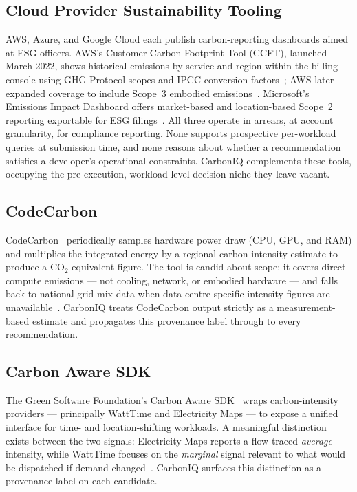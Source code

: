 ﻿\documentclass[conference]{IEEEtran}
\begin{document}
\subsection{Cloud Provider Sustainability Tooling}

AWS, Azure, and Google Cloud each publish carbon-reporting dashboards aimed at ESG
officers.
AWS's Customer Carbon Footprint Tool (CCFT), launched March 2022, shows historical
emissions by service and region within the billing console using GHG Protocol scopes
and IPCC conversion factors~\cite{aws_ccft_launch,aws_ccft_docs};
AWS later expanded coverage to include Scope~3 embodied
emissions~\cite{aws_scope3}.
Microsoft's Emissions Impact Dashboard offers market-based and location-based
Scope~2 reporting exportable for ESG filings~\cite{esg_compare_techtarget}.
All three operate in arrears, at account granularity, for compliance reporting.
None supports prospective per-workload queries at submission time, and none reasons
about whether a recommendation satisfies a developer's operational constraints.
CarbonIQ complements these tools, occupying the pre-execution,
workload-level decision niche they leave vacant.

\subsection{CodeCarbon}

CodeCarbon~\cite{codecarbon_readme} periodically samples hardware power draw
(CPU, GPU, and RAM) and multiplies the integrated energy by a regional
carbon-intensity estimate to produce a CO$_2$-equivalent figure.
The tool is candid about scope: it covers direct compute emissions --- not cooling,
network, or embodied hardware --- and falls back to national grid-mix data when
data-centre-specific intensity figures are unavailable~\cite{codecarbon_faq,
codecarbon_methodology}.
CarbonIQ treats CodeCarbon output strictly as a measurement-based estimate and
propagates this provenance label through to every recommendation.

\subsection{Carbon Aware SDK}

The Green Software Foundation's Carbon Aware SDK~\cite{carbonaware_overview} wraps
carbon-intensity providers --- principally WattTime and Electricity Maps --- to expose
a unified interface for time- and location-shifting workloads.
A meaningful distinction exists between the two signals: Electricity Maps reports a
flow-traced \emph{average} intensity, while WattTime focuses on the \emph{marginal}
signal relevant to what would be dispatched if demand changed~\cite{carbonaware_signal_issue}.
CarbonIQ surfaces this distinction as a provenance label on each candidate.
\end{document}
